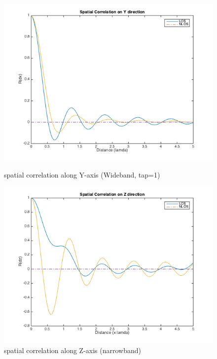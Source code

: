 \documentclass[a4paper]{article}
\begin{document}
    \begin{figure}[ht]
		\begin{minipage}[t]{0.5\linewidth}
			\centering
			\includegraphics[scale=0.4]{figures/wb_spc_Y.png}
			\vspace{-0.3cm}
			\centering
			\caption{spatial correlation along Y-axis (Wideband, tap=1)}
            \label{fig:wb_spc_y}
		\end{minipage}
		\begin{minipage}[t]{0.5\linewidth}
			\centering
			\includegraphics[scale=0.4]{figures/nb_spc_Z.png}
			\vspace{-0.3cm}
			\centering
			\caption{spatial correlation along Z-axis (narrowband)}
            \label{fig:nb_spc_z}
		\end{minipage}
    \end{figure}
    
\end{document}
